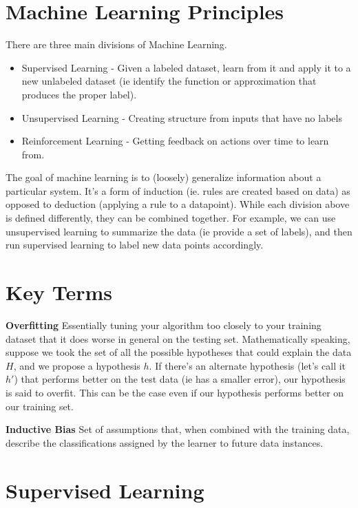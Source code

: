 \documentclass[11pt]{article}
\begin{document}
\tableofcontents

\clearpage

\section{Machine Learning Principles}

There are three main divisions of Machine Learning.

\begin{itemize}
\item Supervised Learning - Given a labeled dataset, learn from it and apply it to a new unlabeled dataset (ie identify the function or approximation that produces the proper label).
\item Unsupervised Learning - Creating structure from inputs that have no labels
\item Reinforcement Learning - Getting feedback on actions over time to learn from.
\end{itemize}

The goal of machine learning is to (loosely) generalize information about a particular system. It's a form of induction (ie. rules are created based on data) as opposed to deduction (applying a rule to a datapoint). While each division above is defined differently, they can be combined together. For example, we can use unsupervised learning to summarize the data (ie provide a set of labels), and then run supervised learning to label new data points accordingly.

\section{Key Terms}

\textbf{Overfitting} Essentially tuning your algorithm too closely to your training dataset that it does worse in general on the testing set. Mathematically speaking, suppose we took the set of all the possible hypotheses that could explain the data $H$, and we propose a hypothesis $h$. If there's an alternate hypothesis (let's call it $h'$) that performs better on the test data (ie has a smaller error), our hypothesis is said to overfit. This can be the case even if our hypothesis performs better on our training set.

\textbf{Inductive Bias} Set of assumptions that, when combined with the training data, describe the classifications assigned by the learner to future data instances.

\section{Supervised Learning}
\end{document}
